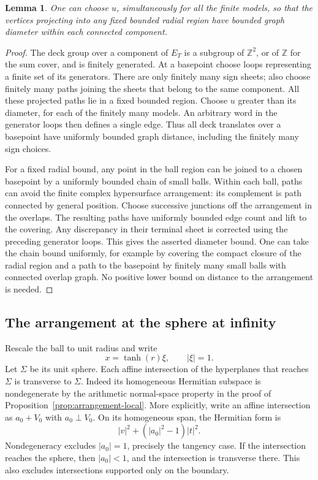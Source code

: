 \documentclass[11pt,reqno]{amsart}
\numberwithin{equation}{section}
\newtheorem{lemma}[theorem]{Lemma}
\theoremstyle{definition}
\theoremstyle{remark}
\newcommand{\Z}{\mathbb Z}
\begin{document}
\begin{lemma}\label{mod:bounded-core}
One can choose $u$, simultaneously for all the finite models, so
that the vertices projecting into any fixed bounded radial region
have bounded graph diameter within each connected component.
\end{lemma}
\begin{proof}
The deck group over a component of $E_T$ is a subgroup of $\Z^2$,
or of $\Z$ for the sum cover, and is finitely generated.  At a
basepoint choose loops representing a finite set of its generators.
There are only finitely many sign sheets; also choose finitely
many paths joining the sheets that belong to the same component.
All these projected paths lie in a fixed bounded region.  Choose
$u$ greater than its diameter, for each of the finitely many models.
An arbitrary word in the generator loops then defines a single
edge.  Thus all deck translates over a basepoint have uniformly
bounded graph distance, including the finitely many sign choices.

For a fixed radial bound, any point in the ball region can be
joined to a chosen basepoint by a uniformly bounded chain of small
balls.  Within each ball, paths can avoid the finite complex
hypersurface arrangement: its complement is path connected by
general position.  Choose successive junctions off the arrangement
in the overlaps.  The resulting paths have uniformly bounded
edge count and lift to the covering.  Any discrepancy in their
terminal sheet is corrected using the preceding generator loops.
This gives the asserted diameter bound.  One can take the chain
bound uniformly, for example by covering the compact closure of
the radial region and a path to the basepoint by finitely many
small balls with connected overlap graph.  No positive lower
bound on distance to the arrangement is needed.
\end{proof}

\subsection{The arrangement at the sphere at infinity}

Rescale the ball to unit radius and write
\[
 x=\tanh(r)\xi,\qquad |\xi|=1.
\]
Let $\Sigma$ be its unit sphere.  Each affine intersection of the
hyperplanes that reaches $\Sigma$ is transverse to $\Sigma$.
Indeed its homogeneous Hermitian subspace is nondegenerate by the
arithmetic normal-space property in the proof of
Proposition~\ref{prop:arrangement-local}.  More explicitly, write
an affine intersection as $a_0+V_0$ with $a_0\perp V_0$.  On its
homogeneous span, the Hermitian form is
\[
 |v|^2+(|a_0|^2-1)|t|^2.
\]
Nondegeneracy excludes $|a_0|=1$, precisely the tangency case.
If the intersection reaches the sphere, then $|a_0|<1$, and the
intersection is transverse there.  This also excludes intersections
supported only on the boundary.
\end{document}
